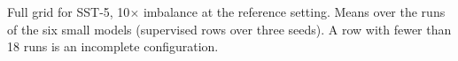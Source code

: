 \begin{table}[t]
  \centering
  \footnotesize
  
  \caption{Full grid for SST-5, 10$\times$ imbalance at the reference setting. Means over the runs of the six small models (supervised rows over three seeds). A row with fewer than 18 runs is an incomplete configuration.}
  \label{tab:grid_sst_imb10}
\end{table}

